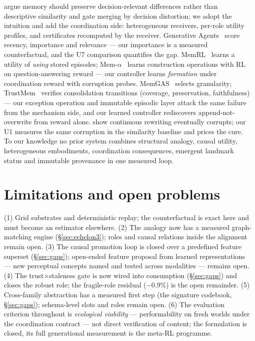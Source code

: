\documentclass{article}
\begin{document}
\citet{rdd2026} argue memory should preserve decision-relevant
differences rather than descriptive similarity and gate merging by
decision distortion; we adopt the intuition and add the coordination
side: heterogeneous receivers, per-role utility profiles, and
certificates recomputed by the receiver. Generative
Agents~\citep{genagents2023} score recency, importance and relevance
--- our importance is a measured counterfactual, and the U7
comparison quantifies the gap. MemRL~\citep{memrl2026} learns a
utility of \emph{using} stored episodes; Mem-$\alpha$~\citep{memalpha2025}
learns construction operations with RL on question-answering reward
--- our controller learns \emph{formation} under coordination reward
with corruption probes. MemGAS~\citep{memgas2025} selects granularity;
TrustMem~\citep{trustmem2026} verifies consolidation transitions
(coverage, preservation, faithfulness) --- our exception operation
and immutable episodic layer attack the same failure from the
mechanism side, and our learned controller rediscovers
append-not-overwrite from reward alone. \citet{faulty2026} show
continuous rewriting eventually corrupts; our U1 measures the same
corruption in the similarity baseline and prices the cure. To our
knowledge no prior system combines structural analogy, causal
utility, heterogeneous embodiments, coordination consequences,
emergent landmark status and immutable provenance in one measured
loop.

\section{Limitations and open problems}
\label{sec:limits}

(1) Grid substrates and deterministic replay; the counterfactual is
exact here and must become an estimator elsewhere. (2) The analogy now has a measured graph-matching engine
(\S\ref{sec:echelon3}); roles and causal relations inside the
alignment remain open. (3) The causal
promotion loop is closed over a predefined feature superset
(\S\ref{sec:gaps}); open-ended feature proposal from learned
representations --- new perceptual concepts named and tested across
modalities --- remains open. (4) The trust$\times$staleness gate is now wired into consumption
(\S\ref{sec:gaps}) and closes the robust role; the fragile-role
residual ($-0.9\%$) is the open remainder. (5) Cross-family
abstraction has a measured first step (the signature codebook,
\S\ref{sec:gaps}); schema-level slots and roles remain open. (6) The evaluation criterion
throughout is \emph{ecological viability} --- performability on fresh
worlds under the coordination contract --- not direct verification of
content; the formulation is closed, its full generational measurement
is the meta-RL programme.
\end{document}
